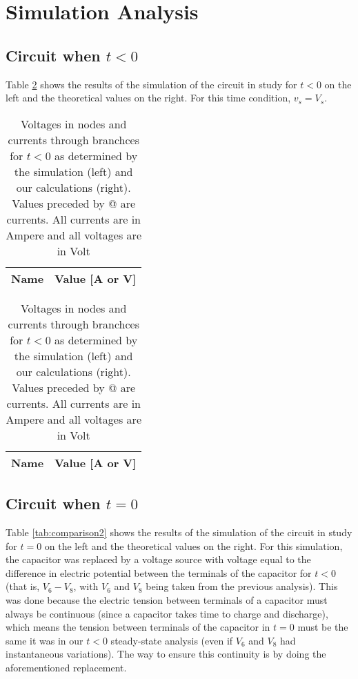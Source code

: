 \section{Simulation Analysis}
\label{sec:simulation}

\subsection{Circuit when $t<0$}

Table \ref{tab:comparison1} shows the results of the simulation of the circuit in study for $t<0$ on the left and the theoretical values on the right. For this time condition, $v_s = V_s$.

\begin{table}[H]
  \centering
  \begin{tabular}{|c|c|}
    \hline    
    {\bf Name} & {\bf Value [A or V]} \\ \hline
    
  \end{tabular}
  \begin{tabular}{|c|c|}
    \hline    
    {\bf Name} & {\bf Value [A or V]} \\ \hline
    
  \end{tabular}
  \caption{Voltages in nodes and currents through branchces for $t<0$ as determined by the simulation (left) and our calculations (right). Values preceded by @ are currents. All currents are in Ampere and all voltages are in Volt}
  \label{tab:comparison1}
\end{table}


\subsection{Circuit when $t=0$}

Table \ref{tab:comparison2} shows the results of the simulation of the circuit in study for $t=0$ on the left and the theoretical values on the right. For this simulation, the capacitor was replaced by a voltage source with voltage equal to the difference in electric potential between the terminals of the capacitor for $t<0$ (that is, $V_6 - V_8$, with $V_6$ and $V_8$ being taken from the previous analysis). This was done because the electric tension between terminals of a capacitor must always be continuous (since a capacitor takes time to charge and discharge), which means the tension between terminals of the capacitor in $t=0$ must be the same it was in our $t<0$ steady-state analysis (even if $V_6$ and $V_8$ had instantaneous variations). The way to ensure this continuity is by doing the aforementioned replacement.

